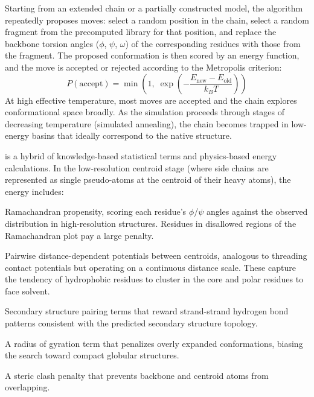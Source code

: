 Starting from an extended chain or a partially constructed model, the algorithm repeatedly proposes moves: select a random position in the chain, select a random fragment from the precomputed library for that position, and replace the backbone torsion angles ($\phi$, $\psi$, $\omega$) of the corresponding residues with those from the fragment. The proposed conformation is then scored by an energy function, and the move is accepted or rejected according to the Metropolis criterion:
\begin{equation}
P(\text{accept}) = \min\left(1,\; \exp\left(-\frac{E_{\text{new}} - E_{\text{old}}}{k_B T}\right)\right)
\label{eq:metropolis}
\end{equation}
At high effective temperature, most moves are accepted and the chain explores conformational space broadly. As the simulation proceeds through stages of decreasing temperature (simulated annealing), the chain becomes trapped in low-energy basins that ideally correspond to the native structure.

 is a hybrid of knowledge-based statistical terms and physics-based energy calculations. In the low-resolution centroid stage (where side chains are represented as single pseudo-atoms at the centroid of their heavy atoms), the energy includes:

Ramachandran propensity, scoring each residue's $\phi$/$\psi$ angles against the observed distribution in high-resolution structures. Residues in disallowed regions of the Ramachandran plot pay a large penalty.

Pairwise distance-dependent potentials between centroids, analogous to threading contact potentials but operating on a continuous distance scale. These capture the tendency of hydrophobic residues to cluster in the core and polar residues to face solvent.

Secondary structure pairing terms that reward strand-strand hydrogen bond patterns consistent with the predicted secondary structure topology.

A radius of gyration term that penalizes overly expanded conformations, biasing the search toward compact globular structures.

A steric clash penalty that prevents backbone and centroid atoms from overlapping.

